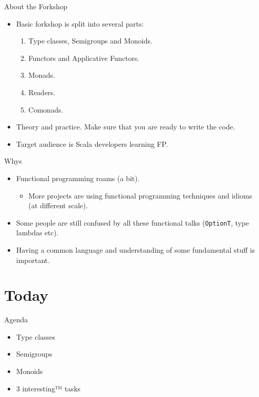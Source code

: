 \documentclass[presentation,aspectratio=169,smaller]{beamer}
\begin{document}
\begin{frame}[label={sec:orge3ead7b}]{About the Forkshop}
\begin{itemize}
\item Basic forkshop is split into several parts:
\begin{enumerate}
\item Type classes, Semigroups and Monoids.
\item Functors and Applicative Functors.
\item Monads.
\item Readers.
\item Comonads.
\end{enumerate}
\item Theory and practice. Make sure that you are ready to write the code.
\item Target audience is Scala developers learning FP.
\end{itemize}
\end{frame}

\begin{frame}[label={sec:org76d2c02},fragile]{Whys}
 \begin{itemize}
\item <1-> Functional programming roams (a bit).
\begin{itemize}
\item More projects are using functional programming techniques and idioms (at
different scale).
\end{itemize}
\item <2-> Some people are still confused by all these functional talks (\texttt{OptionT}, type
lambdas etc).
\item <3-> Having a common language and understanding of some fundamental stuff is
important.
\end{itemize}
\end{frame}

\section*{Today}
\label{sec:org4265820}
\begin{frame}[label={sec:org57bd78b}]{Agenda}
\begin{itemize}
\item Type classes
\item Semigroups
\item Monoids
\item 3 interesting™ tasks
\end{itemize}
\end{frame}
\end{document}
